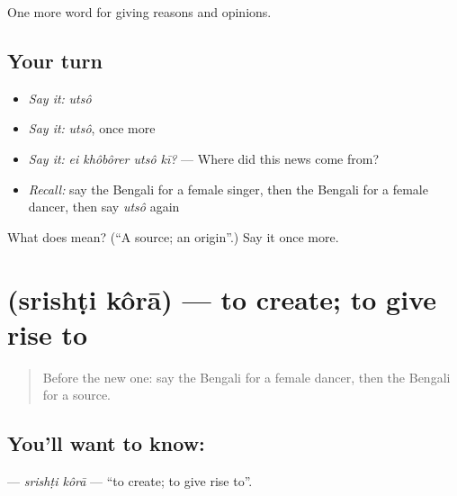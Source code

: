 \begin{grammarlens}[title={What you've built}]
One more word for giving reasons and opinions.
\end{grammarlens}

\subsection*{Your turn}
\begin{itemize}
\raggedright
  \item \emph{Say it:} \emph{utsô}
  \item \emph{Say it:} \emph{utsô}, once more
  \item \emph{Say it:} \emph{ei khôbôrer utsô kī?} — Where did this news come from?
  \item \emph{Recall:} say the Bengali for a female singer, then the Bengali for a female dancer, then say \emph{utsô} again
\end{itemize}

\begin{tcolorbox}[breakable,colback=teal!4,colframe=teal!35!black,title={Before you move on}]
What does  mean? (\textquotedblleft{}A source; an origin\textquotedblright{}.) Say it once more.
\end{tcolorbox}
\section[\texorpdfstring{\bn{সৃষ্টি} \bn{করা} (srishṭi kôrā)}{সৃষ্টি করা (srishṭi kôrā)}]{  (srishṭi kôrā) — to create; to give rise to}

\label{lesson:BN-C330-srishti-kora}



\begin{quote}
Before the new one: say the Bengali for a female dancer, then the Bengali for a source.
\end{quote}

\subsection*{You'll want to know:  }
\textbf{ } — \emph{srishṭi kôrā} — \textquotedblleft{}to create; to give rise to\textquotedblright{}.

\begin{quote}
     
\end{quote}

